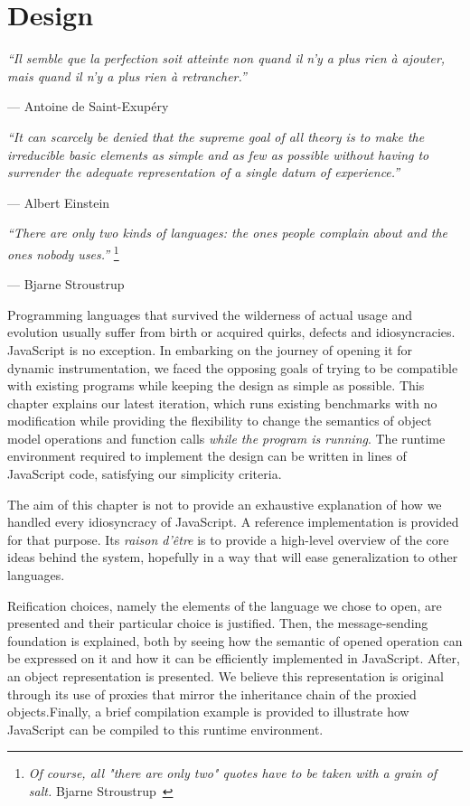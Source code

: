 \chapter{Design}
\label{chap:Design}
\emph{``Il semble que la perfection soit atteinte non quand il n'y a plus rien
\`a ajouter, mais quand il n'y a plus rien \`a retrancher.''}

\hfill --- Antoine de Saint-Exup\'ery

\emph{``It can scarcely be denied that the supreme goal of all theory is to
make the irreducible basic elements as simple and as few as possible without
having to surrender the adequate representation of a single datum of
experience.''}

\hfill --- Albert Einstein

\emph{``There are only two kinds of languages: the ones people complain about
and the ones nobody uses.''} \footnote{\emph{Of course, all "there are only
two" quotes have to be taken with a grain of salt.} Bjarne Stroustrup~\cite{stroustrup}}

\hfill --- Bjarne Stroustrup

Programming languages that survived the wilderness of actual usage and
evolution usually suffer from birth or acquired quirks, defects and
idiosyncracies. JavaScript is no exception. In embarking on the journey of
opening it for dynamic instrumentation, we faced the opposing goals of trying
to be compatible with existing programs while keeping the design as simple as
possible. This chapter explains our latest iteration, which runs existing
benchmarks with no modification while providing the flexibility to change the
semantics of object model operations and function calls \textit{while the
program is running}. The runtime environment required to implement the design
can be written in  lines
of JavaScript code, satisfying our simplicity criteria.

The aim of this chapter is not to provide an exhaustive explanation of how we
handled every idiosyncracy of JavaScript. A reference implementation is
provided for that purpose. Its \textit{raison d'\^etre} is to provide a
high-level overview of the core ideas behind the system, hopefully in a way
that will ease generalization to other languages.

Reification choices, namely the elements of the language we chose to open, are
presented and their particular choice is justified. Then, the message-sending
foundation is explained, both by seeing how the semantic of opened operation
can be expressed on it and how it can be efficiently implemented in JavaScript.
After, an object representation is presented. We believe this representation is
original through its use of proxies that mirror the inheritance chain of the
proxied objects.Finally, a brief compilation example is provided to illustrate
how JavaScript can be compiled to this runtime environment.

